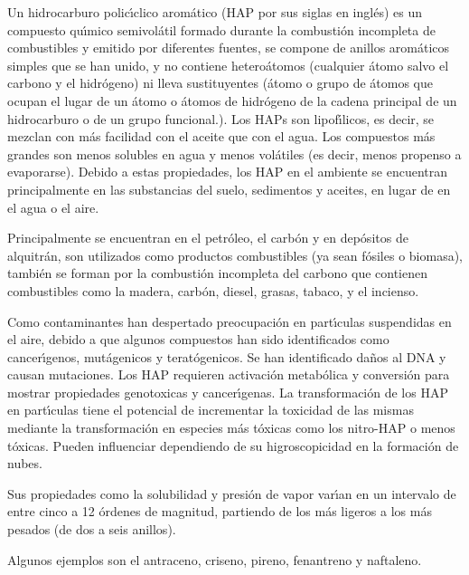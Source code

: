 Un hidrocarburo polic\'{\i}clico arom\'atico   ({HAP} por sus siglas en ingl\'es) es un compuesto qu\'{\i}mico semivol\'atil formado durante la combusti\'on incompleta de combustibles y emitido por diferentes fuentes, se compone de anillos arom\'aticos simples que se han unido, y no contiene hetero\'atomos (cualquier \'atomo salvo el carbono y el hidr\'o\-ge\-no) ni lleva sustituyentes (\'atomo o grupo de \'atomos que ocupan el lugar de un \'atomo o \'atomos de hidr\'ogeno de la cadena principal de un hidrocarburo o de un grupo funcional.). Los \gls{HAP}s son lipof\'{\i}licos, es decir, se mezclan con m\'as facilidad con el aceite que con el agua. Los compuestos m\'as grandes son menos solubles en agua y menos vol\'atiles (es decir, menos propenso a evaporarse). Debido a estas propiedades, los HAP en el  ambiente se encuentran principalmente en las substancias del suelo, sedimentos y aceites, en lugar de en el agua o el aire. 

Principalmente se encuentran en el petr\'oleo, el carb\'on y en dep\'ositos de alquitr\'an, son utilizados como productos combustibles (ya sean f\'osiles o biomasa), tambi\'en se forman por la combusti\'on incompleta del carbono que contienen combustibles como la madera, carb\'on, diesel, grasas, tabaco, y el incienso.

Como contaminantes han despertado preocupaci\'on en part\'{\i}culas suspendidas en el aire, debido a que algunos compuestos han sido identificados como cancer\'{\i}genos, mut\'agenicos y terat\'ogenicos. Se han identificado da\~nos al DNA y causan mutaciones. Los HAP requieren activaci\'on metab\'olica y conversi\'on para mostrar propiedades \gls{genotoxicas} y cancer\'{\i}genas. La transformaci\'on de los HAP en part\'{\i}culas tiene el potencial de incrementar la toxicidad de las mismas mediante la transformaci\'on en especies m\'as t\'oxicas como los nitro-HAP o menos t\'oxicas.  Pueden influenciar dependiendo de su higroscopicidad en la formaci\'on de nubes.

Sus propiedades como la solubilidad y presi\'on de vapor var\'{\i}an en un intervalo de entre cinco a 12 \'ordenes de magnitud, partiendo de los m\'as ligeros a los m\'as pesados (de dos a seis anillos).

Algunos ejemplos son el antraceno, criseno, pireno, fenantreno y naftaleno.

